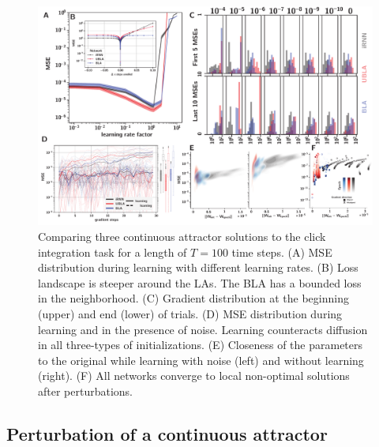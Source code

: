 \documentclass{article} %
\newcounter{ct}
\theoremstyle{definition}
\theoremstyle{remark}
\begin{document}

\begin{figure}[H]
  \centering
  \includegraphics[width=\textwidth]{maintenance_h0.pdf}
  \caption{
  Comparing three continuous attractor solutions to the click integration task for a length of $T=100$ time steps.
(A) MSE distribution during learning with different learning rates.
(B) Loss landscape is steeper around the LAs. The BLA has a bounded loss in the neighborhood.
(C) Gradient distribution at the beginning (upper) and end (lower) of trials.
(D) MSE distribution during learning and in the presence of noise. Learning counteracts diffusion in all three-types of initializations.
(E) Closeness of the parameters to the original while learning with noise (left) and without learning (right).
(F) All networks converge to local non-optimal solutions after perturbations.
  }
  \label{fig:maintenance_h0}
\end{figure}

\subsection{Perturbation of a continuous attractor}\label{sec:hd} %

\end{document}
